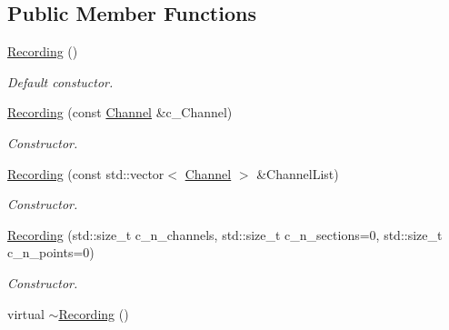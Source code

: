 \subsection*{Public Member Functions}
\begin{DoxyCompactItemize}
\item 
\hypertarget{classRecording_a270f855f9547078427135d75854cd7c6}{
\hyperlink{classRecording_a270f855f9547078427135d75854cd7c6}{Recording} ()}
\label{classRecording_a270f855f9547078427135d75854cd7c6}

\begin{DoxyCompactList}\small\item\em Default constuctor. \item\end{DoxyCompactList}\item 
\hyperlink{classRecording_ac1219247e33bfd916d32d00d4fc86051}{Recording} (const \hyperlink{classChannel}{Channel} \&c\_\-Channel)
\begin{DoxyCompactList}\small\item\em Constructor. \item\end{DoxyCompactList}\item 
\hyperlink{classRecording_ae1d7a66d03e2754c9ecaa6920d28f672}{Recording} (const std::vector$<$ \hyperlink{classChannel}{Channel} $>$ \&ChannelList)
\begin{DoxyCompactList}\small\item\em Constructor. \item\end{DoxyCompactList}\item 
\hyperlink{classRecording_a35b98e700d186598e8a1aa6c34b47352}{Recording} (std::size\_\-t c\_\-n\_\-channels, std::size\_\-t c\_\-n\_\-sections=0, std::size\_\-t c\_\-n\_\-points=0)
\begin{DoxyCompactList}\small\item\em Constructor. \item\end{DoxyCompactList}\item 
\hypertarget{classRecording_aed6604f8b6f495f7570c9844290add2a}{
virtual \hyperlink{classRecording_aed6604f8b6f495f7570c9844290add2a}{$\sim$Recording} ()}
\label{classRecording_aed6604f8b6f495f7570c9844290add2a}


\end{DoxyCompactItemize}
